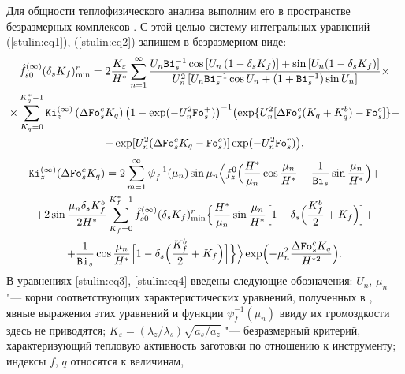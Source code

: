 Для общности теплофизического анализа выполним его в пространстве
безразмерных комплексов \cite{stulin:bib4}. С этой целью систему
интегральных уравнений (\ref{stulin:eq1}), (\ref{stulin:eq2})
запишем в безразмерном виде:
\begin{multline}
\label{stulin:eq3}
 \hat {f}_{s0}^{(\infty )} (\delta _s K_f )_{\min}^r =2\frac{K_\varepsilon
}{H^\ast }\sum\limits_{n=1}^\infty \frac{{U_n}{{\tt Bi}_s^{-1}}\cos
\left[ U_n \left( 1-\delta _s K_f \right) \right]+\sin \left[U_n
(1-\delta _s K_f ) \right]}{U_n^2 \left[ {U_n }{{\tt Bi}_s ^{-1}}\cos U_n +\left(1+{{\tt Bi}_s ^{-1}} \right)\sin U_n \right]}\times \\
 \times \sum\limits_{K_q =0}^{K_q^\ast -1} {\tt Ki}_z^{(\infty )} \left( \Delta {\tt Fo}_s^c K_q  \right)
 \bigl({1-\exp ( -U_n^2 {\tt Fo}_s^+ )}\bigr)^{-1}
\bigl(\exp \{ U_n^2 [ \Delta {\tt Fo}_s^c ( K_q +K_q^b )-{\tt Fo}_s^c ]\}-\\
-\exp [ U_n^2 (\Delta {\tt Fo}_s^c K_q -{\tt Fo}_s^c ) ] \exp (-U_n^2 {\tt Fo}_s^r ) \bigr),
 \end{multline}
\begin{multline}
\label{stulin:eq4} {\tt Ki}_z^{(\infty )} ( \Delta {\tt Fo}_s^c K_q )=
2\sum\limits_{m=1}^\infty \psi_f^{-1} ( \mu _n ) \sin \mu _n 
\Bigl\langle f_z^0 \Bigl( \frac{H^\ast }{\mu _n }\cos \frac{\mu _n }{H^\ast }-\frac{1}{{\tt Bi}_s }\sin \frac{\mu _n }{H^\ast } \Bigr)+  \\
 +2\sin \frac{\mu _n \delta _s K_f^b }{2H^\ast }\sum\limits_{K_f =0}^{K_f^\ast -1} \hat {f}_{s0}^{(\infty )} (\delta _s K_f )_{\min}^r  
 \Bigl\{ \frac{H^\ast }{\mu _n } \sin \frac{\mu _n }{H^\ast }\Bigl[1-\delta _s \Bigl( \frac{K_f^b }{2}+K_f \Bigr) \Bigr]+ \\
 +\frac{1}{{\tt Bi}_s }\cos \frac{\mu _n }{H^\ast } \Bigl[ 1-\delta _s \Bigl( \frac{K_f^b }{2}+K_f \Bigr) \Bigr] \Bigr\} \Bigr\rangle 
 \exp \Bigl( -\mu _n^2 \frac{\Delta {\tt Fo}_s^c K_q }{H^{\ast 2}}\Bigr).
 \end{multline}
В уравнениях \eqref{stulin:eq3}, \eqref{stulin:eq4} введены следующие
обозначения: $U_n$, $\mu _n $ "--- корни соответствующих
характеристических уравнений, полученных в \cite{stulin:bib1},
явные выражения этих уравнений и функции $\psi _f^{-1} (\mu _n )$
ввиду их громоздкости здесь не приводятся; $K_\varepsilon = (\lambda _z/\lambda _s) \sqrt {a_s /a_z } $ "--- безразмерный критерий, характеризующий тепловую активность заготовки по отношению к
инструменту; индексы $f$, $q$ относятся к величинам,
